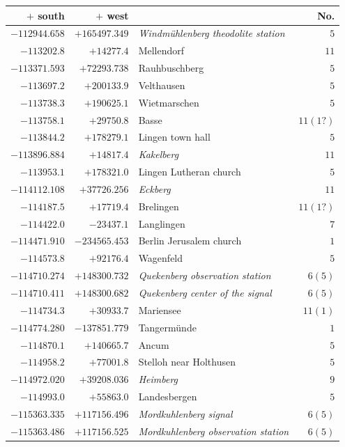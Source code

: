 \clearpage{}%
\begin{center}\begingroup\fontsize{8}{9}\selectfont
\setlength{\tabcolsep}{4pt}
\begin{tabular}{r|r|p{170pt}|r}\hline
\(+\) south&\(+\) west&&No.\\\hline
\(-112944.658\)&\(+165497.349\)&\textit{Windmühlenberg theodolite station}&\(5\)\\
\(-113202.8\)&\(+14277.4\)&Mellendorf&\(11\)\\
\(-113371.593\)&\(+72293.738\)&Rauhbuschberg&\(5\)\\
\(-113697.2\)&\(+200133.9\)&Velthausen&\(5\)\\
\(-113738.3\)&\(+190625.1\)&Wietmarschen&\(5\)\\
\(-113758.1\)&\(+29750.8\)&Basse&\(11(1?)\)\\
\(-113844.2\)&\(+178279.1\)&Lingen town hall&\(5\)\\
\(-113896.884\)&\(+14817.4\)&\textit{Kakelberg}&\(11\)\\
\(-113953.1\)&\(+178321.0\)&Lingen Lutheran church&\(5\)\\
\(-114112.108\)&\(+37726.256\)&\textit{Eckberg}&\(11\)\\
\(-114187.5\)&\(+17719.4\)&Brelingen&\(11(1?)\)\\
\(-114422.0\)&\(-23437.1\)&Langlingen&\(7\)\\
\(-114471.910\)&\(-234565.453\)&Berlin Jerusalem church&\(1\)\\
\(-114573.8\)&\(+92176.4\)&Wagenfeld&\(5\)\\
\(-114710.274\)&\(+148300.732\)&\textit{Quekenberg observation station}&\(6(5)\)\\
\(-114710.411\)&\(+148300.682\)&\textit{Quekenberg center of the signal}&\(6(5)\)\\
\(-114734.3\)&\(+30933.7\)&Mariensee&\(11 (1)\)\\
\(-114774.280\)&\(-137851.779\)&Tangermünde&\(1\)\\
\(-114870.1\)&\(+140665.7\)&Ancum&\(5\)\\
\(-114958.2\)&\(+77001.8\)&Stelloh near Holthusen&\(5\)\\
\(-114972.020\)&\(+39208.036\)&\textit{Heimberg}&\(9\)\\
\(-114993.0\)&\(+55863.0\)&Landesbergen&\(5\)\\
\(-115363.335\)&\(+117156.496\)&\textit{Mordkuhlenberg signal}&\(6 (5)\)\\
\(-115363.486\)&\(+117156.525\)&\textit{Mordkuhlenberg observation station}&\(6(5)\)\\

\end{tabular}
\end{center}
